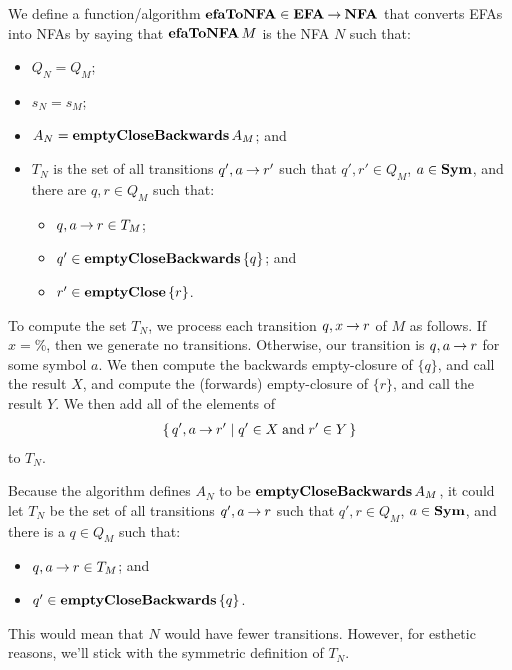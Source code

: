 We define a function/algorithm $\mathbf{efaToNFA}\in\mathbf{EFA}\mathbin{\to}\mathbf{NFA}$ that
%
%
converts EFAs into NFAs by saying that $\mathbf{efaToNFA}\,M$ is the NFA $N$
such that:
\begin{itemize}
\item $Q_N=Q_M$;

\item $s_N=s_M$;

\item $A_N=\mathbf{emptyCloseBackwards}\,A_M$; and

\item $T_N$ is the set of all transitions $q', a\mathbin{\to} r'$ such that
  $q',r'\in Q_M$, $a\in\mathbf{Sym}$, and there are $q,r\in Q_M$ such that:
\begin{itemize}
\item $q,a\mathbin{\to} r\in T_M$;
\item $q'\in{\mathbf{emptyCloseBackwards}\,\{q\}}$; and
\item $r'\in{\mathbf{emptyClose}\,\{r\}}$.
\end{itemize}
\end{itemize}

To compute the set $T_N$, we process each transition $q,x\mathbin{\to} r$ of
$M$ as follows.  If $x=\%$, then we generate no transitions.
Otherwise, our transition is $q, a\mathbin{\to} r$ for some symbol $a$.  We
then compute the backwards empty-closure of $\{q\}$, and call the
result $X$, and compute the (forwards) empty-closure of $\{r\}$, and
call the result $Y$.  We then add all of the elements of
\begin{gather*}
\{ \, q', a\mathbin{\to} r' \mid q'\in X\;\allowbreak\mbox{and}\allowbreak\;r'\in Y \, \}
\end{gather*}
to $T_N$.

Because the algorithm defines $A_N$ to be $\mathbf{emptyCloseBackwards}\,A_M$,
it could let $T_N$ be the set of all transitions $q',a\mathbin{\to} r$
such that $q',r\in Q_M$, $a\in\mathbf{Sym}$, and there is a $q\in Q_M$ such
that:
\begin{itemize}
\item $q,a\mathbin{\to} r\in T_M$; and
\item $q'\in{\mathbf{emptyCloseBackwards}\,\{q\}}$.
\end{itemize}
This would mean that $N$ would have fewer transitions.  However, for
esthetic reasons, we'll stick with the symmetric definition of $T_N$.

